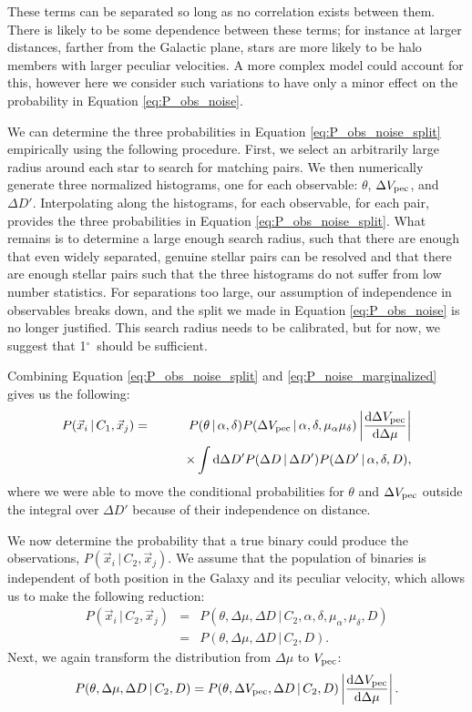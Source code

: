 \documentclass[12pt, preprint]{aastex}
\newcommand{\given}{\,|\,}
\newcommand{\dd}{\mathrm{d}}
\newcommand{\degree}{\ifmmode {^\circ}\else$^\circ$\ \fi}
\begin{document}
These terms can be separated so long as no correlation exists between them. There is likely to be some dependence between these terms; for instance at larger distances, farther from the Galactic plane, stars are more likely to be halo members with larger peculiar velocities. A more complex model could account for this, however here we consider such variations to have only a minor effect on the probability in Equation \ref{eq:P_obs_noise}. 

We can determine the three probabilities in Equation \ref{eq:P_obs_noise_split} empirically using the following procedure. First, we select an arbitrarily large radius around each star to search for matching pairs. We then numerically generate three normalized histograms, one for each observable: $\theta$, $\Delta V_{\rm pec}$, and $\Delta D'$. Interpolating along the histograms, for each observable, for each pair, provides the three probabilities in Equation \ref{eq:P_obs_noise_split}. What remains is to determine a large enough search radius, such that there are enough that even widely separated, genuine stellar pairs can be resolved and that there are enough stellar pairs such that the three histograms do not suffer from low number statistics. For separations too large, our assumption of independence in observables breaks down, and the split we made in Equation \ref{eq:P_obs_noise} is no longer justified. This search radius needs to be calibrated, but for now, we suggest that 1\degree should be sufficient.

Combining Equation \ref{eq:P_obs_noise_split} and \ref{eq:P_noise_marginalized} gives us the following:
\begin{eqnarray}
P(\vec{x}_i \given C_1, \vec{x}_j) &=& P(\theta \given \alpha, \delta) 
   P(\Delta V_{\rm pec} \given \alpha, \delta, \mu_{\alpha} \mu_{\delta}) 
   \left| \frac{\dd \Delta V_{\rm pec}}{\dd \Delta \mu} \right| \nonumber \\
   & & \qquad \times  \int \dd \Delta D' P(\Delta D \given \Delta D') P(\Delta D' \given \alpha, \delta, D),
\end{eqnarray}
where we were able to move the conditional probabilities for $\theta$ and $\Delta V_{\rm pec}$ outside the integral over $\Delta D'$ because of their independence on distance.


We now determine the probability that a true binary could produce the observations, $P(\vec{x}_i \given C_2, \vec{x}_j)$. We assume that the population of binaries is independent of both position in the Galaxy and its peculiar velocity, which allows us to make the following reduction:
\begin{eqnarray}
P(\vec{x}_i \given C_2, \vec{x}_j) &=& P(\theta, \Delta \mu, \Delta D \given C_2, \alpha, \delta, \mu_{\alpha}, \mu_{\delta}, D ) \\
&=& P(\theta, \Delta \mu, \Delta D \given C_2, D).
\end{eqnarray}
Next, we again transform the distribution from $\Delta \mu$ to $V_{\rm pec}$:
\begin{equation}
P(\theta, \Delta \mu, \Delta D \given C_2, D) = P(\theta, \Delta V_{\rm pec}, \Delta D \given C_2, D) \left| \frac{\dd \Delta V_{\rm pec}}{\dd \Delta \mu} \right|.
\end{equation}
\end{document}
